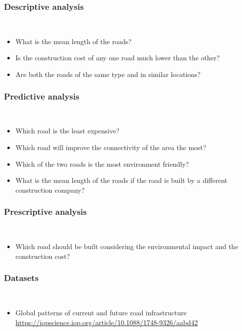 \documentclass[12pt]{article}
\begin{document}
    \subsubsection*{Descriptive analysis}\\
    \begin{itemize}
        \item What is the mean length of the roads?
        \item Is the construction cost of any one road much lower than the other?
        \item Are both the roads of the same type and in similar locations?
    \end{itemize}
    
    \subsubsection*{Predictive analysis}\\
    \begin{itemize}
        \item Which road is the least expensive?
        \item Which road will improve the connectivity of the area the most?
        \item Which of the two roads is the most environment friendly?
        \item What is the mean length of the roads if the road is built by a different construction company?
    \end{itemize}

    \subsubsection*{Prescriptive analysis}\\
    \begin{itemize}
        \item Which road should be built considering the environmental impact and the construction cost?
    \end{itemize}

    \subsubsection*{Datasets}\\
    \begin{itemize}
        \item Global patterns of current and future road infrastructure\\
        \url{https://iopscience.iop.org/article/10.1088/1748-9326/aabd42}
    \end{itemize}
\end{document}
